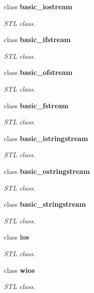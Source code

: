 \begin{DoxyCompactItemize}
class {\bfseries basic\_\-iostream}
\begin{DoxyCompactList}\small\item\em STL class. \item\end{DoxyCompactList}\item 
class {\bfseries basic\_\-ifstream}
\begin{DoxyCompactList}\small\item\em STL class. \item\end{DoxyCompactList}\item 
class {\bfseries basic\_\-ofstream}
\begin{DoxyCompactList}\small\item\em STL class. \item\end{DoxyCompactList}\item 
class {\bfseries basic\_\-fstream}
\begin{DoxyCompactList}\small\item\em STL class. \item\end{DoxyCompactList}\item 
class {\bfseries basic\_\-istringstream}
\begin{DoxyCompactList}\small\item\em STL class. \item\end{DoxyCompactList}\item 
class {\bfseries basic\_\-ostringstream}
\begin{DoxyCompactList}\small\item\em STL class. \item\end{DoxyCompactList}\item 
class {\bfseries basic\_\-stringstream}
\begin{DoxyCompactList}\small\item\em STL class. \item\end{DoxyCompactList}\item 
class {\bfseries ios}
\begin{DoxyCompactList}\small\item\em STL class. \item\end{DoxyCompactList}\item 
class {\bfseries wios}
\begin{DoxyCompactList}\small\item\em STL class. \item\end{DoxyCompactList}\item 

\end{DoxyCompactItemize}
